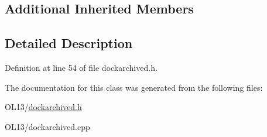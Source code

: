 \subsection*{Additional Inherited Members}


\subsection{Detailed Description}


Definition at line 54 of file dockarchived.\+h.



The documentation for this class was generated from the following files\+:\begin{DoxyCompactItemize}
\item 
O\+L13/\hyperlink{dockarchived_8h}{dockarchived.\+h}\item 
O\+L13/dockarchived.\+cpp\end{DoxyCompactItemize}
